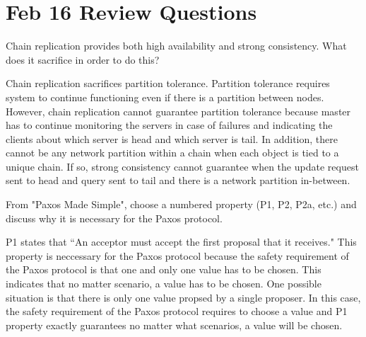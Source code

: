 \section{Feb 16 Review Questions}
\begin{QandA}
   \item Chain replication provides both high availability and strong consistency. What does it sacrifice in order to do this?
         \begin{answered}
		 Chain replication sacrifices partition tolerance. Partition tolerance requires system to continue functioning even if there
		 is a partition between nodes. However, chain replication cannot guarantee partition tolerance because master has to continue
		 monitoring the servers in case of failures and indicating the clients about which server is head and which server is tail.
		 In addition, there cannot be any network partition within a chain when each object is tied to a unique chain. If so, strong consistency
		 cannot guarantee when the update request sent to head and query sent to tail and there is a network partition in-between.
         \end{answered}

   \item From "Paxos Made Simple", choose a numbered property (P1, P2, P2a, etc.) and discuss why it is necessary for the Paxos protocol.
         \begin{answered}
		 P1 states that ``An acceptor must accept the first proposal that it receives." This property is neccessary for the Paxos protocol
		 because the safety requirement of the Paxos protocol is that one and only one value has to be chosen. This indicates that no matter 
		 scenario, a value has to be chosen. One possible situation is that there is only one value propsed by a single proposer. In this case,
		 the safety requirement of the Paxos protocol requires to choose a value and P1 property exactly guarantees no matter what scenarios,
		 a value will be chosen.
         \end{answered}
         

\end{QandA}
